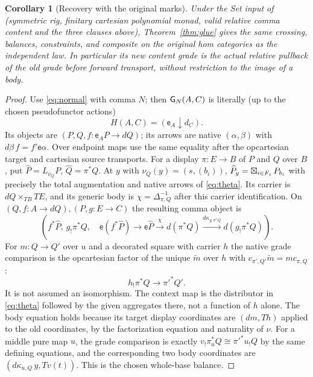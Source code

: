 \documentclass[11pt]{article}
\newtheorem{corollary}[theorem]{Corollary}
\theoremstyle{definition}\newtheorem{definition}[theorem]{Definition}
\newcommand{\ea}{\mathsf e}\newcommand{\un}{\mathbf1}\newcommand{\Tt}{\overline T}
\begin{document}
\begin{corollary}[Recovery with the original marks]\label{cor:recover}
Under the Set input of \cite{O1,C} (symmetric rig, finitary
cartesian polynomial monad, valid relative comma content and the
three clauses above), Theorem~\ref{thm:glue} gives the same crossing,
balances, constraints, and composite on the original hom categories as
the independent law. In particular its new content grade is the
\emph{actual} relative pullback of the old grade before forward
transport, without restriction to the image of a body.
\end{corollary}
\begin{proof}
Use \eqref{eq:normal} with comma $N$; then $\mathsf G_N(A,C)$ is
literally (up to the chosen pseudofunctor actions)
\[
 H(A,C)=(\ea_A\downarrow d_C).
\]
Its objects are $(P,Q,f:\ea_AP\to dQ)$; its arrows are native
$(\alpha,\beta)$ with $d\beta\,f=f'\ea\alpha$. Over endpoint
maps use the same equality after the opcartesian target and
cartesian source transports. For a display $\pi:E\to B$ of $P$
and $Q$ over $B$, put $\widehat P=L_{\nu_Q}P$,
$\widehat Q=\pi^*Q$. At $y$ with $\nu_Q(y)=(s,(b_i))$,
$\widehat P_y=\mathop{\boxtimes}_{i\in F_s}P_{b_i}$ with precisely the total
augmentation and native arrows of \eqref{eq:theta}. Its carrier is
$dQ\times_{TB}TE$, and its generic body is $\chi=\Delta_{\pi,Q}^{-1}$
after this carrier identification. On $(Q,f:A\to dQ),(P,g:E\to C)$
the resulting comma object is
\[
 \left(f^*\widehat P,\ g_!\pi^*Q,\quad
      \ea(f^*\widehat P)\to\ea\widehat P
       \xrightarrow{\chi}d(\pi^*Q)
       \xrightarrow{d\kappa_{g,\pi^*Q}}d(g_!\pi^*Q)\right).
 \tag{13}\label{eq:setcross}
\]
For $m:Q\to Q'$ over $u$ and a decorated square with carrier $h$ the
native grade comparison is the opcartesian factor of the unique
$\widetilde m$ over $h$ with
$c_{\pi',Q'}\widetilde m=m c_{\pi,Q}$:
\[
              h_!\pi^*Q\longrightarrow\pi'^*Q'.
\]
It is not assumed an isomorphism. The context map is the distributor in \eqref{eq:theta}
followed by the given aggregates there, not a function of $h$
alone. The body equation holds because its target display coordinates
are $(dm,Th)$ applied to the old coordinates, by the factorization
equation and naturality of $\nu$. For a middle pure map $u$, the
grade comparison is exactly $v_!\pi_u^*Q\cong\pi'^*u_!Q$ by the
same defining equations, and the corresponding two body coordinates
are $(d\kappa_{u,Q}\,y,Tv(t))$. This is the chosen whole-base balance.


\end{proof}
\end{document}
